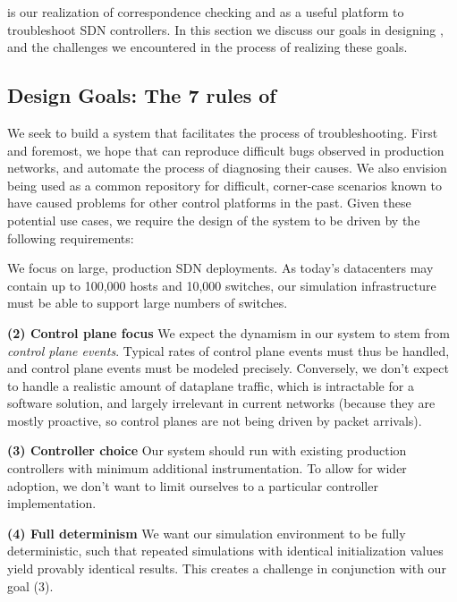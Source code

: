 
\projectname{} is our realization of correspondence checking and \simulator{}
as a useful platform to troubleshoot SDN controllers. In this section we discuss
our goals in designing \simulator{}, and the challenges we encountered in the process
of realizing these goals.

\subsection{Design Goals: The 7 rules of \projectname{}}

We seek to build a system that facilitates the process of troubleshooting.
First and foremost, we hope that \projectname{} can reproduce difficult bugs
observed in production networks, and automate the process of diagnosing their
causes. We also envision \projectname{} being used as a common repository for difficult, corner-case
scenarios known to have caused problems for other control platforms in the past.
Given these potential use cases, we require the design of the system to be
driven by the following requirements:

 We focus on large, production SDN
deployments. As today's datacenters may contain up to 100,000 hosts and 10,000
switches, our simulation infrastructure must be able to support large numbers
of switches.

\noindent \textbf{(2) Control plane focus} We expect the dynamism in our system to stem from
\emph{control plane events}. Typical rates of control plane events must thus be
handled, and control plane events must be modeled precisely. Conversely, we
don't expect to handle a realistic amount of dataplane traffic, which is
intractable for a software solution, and largely irrelevant in current networks (because they are mostly proactive, so control planes are not being driven by packet arrivals).

\noindent \textbf{(3) Controller choice} Our system should run with existing production
controllers with minimum additional instrumentation. To allow for wider adoption, we don't want to limit ourselves to
a particular controller implementation.

\noindent \textbf{(4) Full determinism} We want our simulation environment to be fully
deterministic, such that repeated simulations with identical initialization values
yield provably identical results. This creates a challenge in conjunction with our goal (3).

